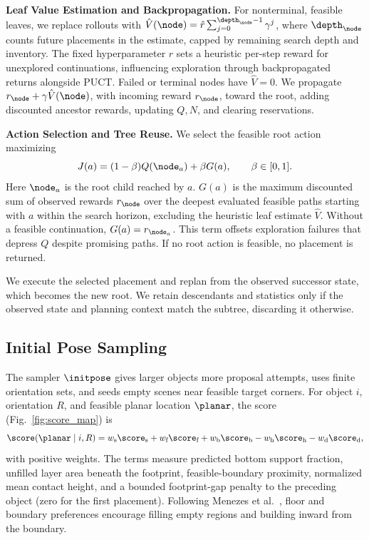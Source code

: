 \noindent \textbf{Leaf Value Estimation and Backpropagation.}
For nonterminal, feasible leaves, we replace rollouts with $\hat V(\node)=\hat r\sum_{j=0}^{\depth_{\node}-1}\gamma^j$, where $\depth_{\node}$ counts future placements in the estimate, capped by remaining search depth and inventory.
The fixed hyperparameter $\hat r$ sets a heuristic per-step reward for unexplored continuations, influencing exploration through backpropagated returns alongside PUCT.
Failed or terminal nodes have $\hat V=0$.
We propagate $r_{\node}+\gamma\hat V(\node)$, with incoming reward $r_{\node}$, toward the root, adding discounted ancestor rewards, updating $Q,N$, and clearing reservations.

\noindent \textbf{Action Selection and Tree Reuse.}
We select the feasible root action maximizing
\begin{equation*}
  J(a)=(1-\beta)Q(\node_a)+\beta G(a),\qquad \beta\in[0,1].
\end{equation*}
Here $\node_a$ is the root child reached by $a$.
$G(a)$ is the maximum discounted sum of observed rewards $r_{\node}$ over the deepest evaluated feasible paths starting with $a$ within the search horizon, excluding the heuristic leaf estimate $\hat V$.
Without a feasible continuation, $G(a)=r_{\node_a}$.
This term offsets exploration failures that depress $Q$ despite promising paths. If no root action is feasible, no placement is returned.

We execute the selected placement and replan from the observed successor state, which becomes the new root.
We retain descendants and statistics only if the observed state and planning context match the subtree, discarding it otherwise.



\subsection{Initial Pose Sampling}\label{sec:initial_pose_sampling}
The sampler $\initpose$ gives larger objects more proposal attempts, uses finite orientation sets, and seeds empty scenes near feasible target corners.
For object $i$, orientation $R$, and feasible planar location $\planar$, the score (Fig.~\ref{fig:score_map}) is
\begin{equation*}
  \score(\planar\mid i,R)
  =w_\text{s}\score_\text{s}+w_\text{f}\score_\text{f}
   +w_\text{b}\score_\text{b}-w_\text{h}\score_\text{h}-w_\text{d}\score_\text{d},
\end{equation*}
with positive weights. The terms measure predicted bottom support fraction, unfilled layer area beneath the footprint, feasible-boundary proximity, normalized mean contact height, and a bounded footprint-gap penalty to the preceding object (zero for the first placement).
Following Menezes et al.~\cite{menezes2021rocks}, floor and boundary preferences encourage filling empty regions and building inward from the boundary.

